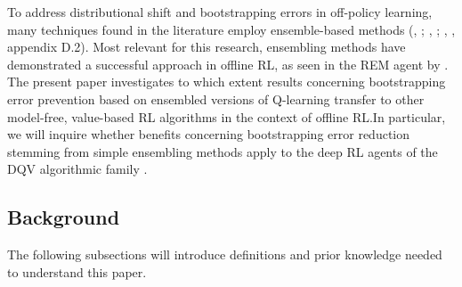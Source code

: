 To address distributional shift and bootstrapping errors in
off-policy learning, many techniques found in the literature employ
ensemble-based methods (\citeauthor{osband2016deep},
\citeyear{osband2016deep}; \citeauthor{anschel2017averaged},
\citeyear{anschel2017averaged}; \citeauthor{pmlr-v97-fujimoto19a},
\citeyear{pmlr-v97-fujimoto19a}, appendix D.2).
Most relevant for this research,
ensembling methods have demonstrated a successful approach in
offline RL, as seen in the REM agent by
\citet{agarwal2020optimistic}. The present
paper investigates to which extent results concerning bootstrapping
error prevention based on ensembled versions of Q-learning transfer to
other model-free, value-based RL algorithms in the context of offline
RL.\@ In particular, we will inquire whether benefits concerning
bootstrapping error reduction stemming from simple ensembling methods
apply to the deep RL agents of the DQV algorithmic family
\citep{sabatelli2020deep}.

\subsection{Background}
The following subsections will introduce definitions and prior
knowledge needed to understand this paper.






